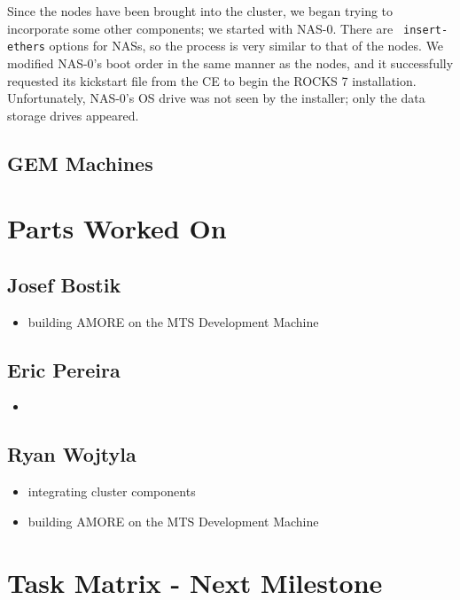 \documentclass[12pt]{article}
\newcommand\tab[1][1cm]{\hspace*{#1}}
\begin{document}
\tab Since the nodes have been brought into the cluster, we began trying to
incorporate some other components; we started with NAS-0. There are {\tt
  insert-ethers} options for NASs, so the process is very similar to that of the
nodes. We modified NAS-0's boot order in the same manner as the nodes, and it
successfully requested its kickstart file from the CE to begin the ROCKS 7
installation. Unfortunately, NAS-0's OS drive was not seen by the installer;
only the data storage drives appeared. 

\subsection{GEM Machines}

\tab 
\section{Parts Worked On}

\subsection{Josef Bostik}

\begin{itemize}
\item building AMORE on the MTS Development Machine
\end{itemize}

\subsection{Eric Pereira}

\begin{itemize}
\item 
\end{itemize}

\subsection{Ryan Wojtyla}

\begin{itemize}
\item integrating cluster components
\item building AMORE on the MTS Development Machine
\end{itemize}

\section{Task Matrix - Next Milestone}
\end{document}
